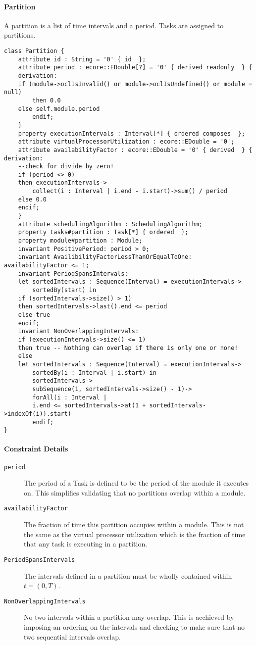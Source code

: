 \paragraph{Partition}
A partition is a list of time intervals and a period. Tasks are assigned to partitions.
\begin{lstlisting}[caption=Partition constraints]
class Partition {
    attribute id : String = '0' { id  };
    attribute period : ecore::EDouble[?] = '0' { derived readonly  } {
	derivation:
	if (module->oclIsInvalid() or module->oclIsUndefined() or module = null)
    	then 0.0
	else self.module.period
    	endif;
    }
    property executionIntervals : Interval[*] { ordered composes  };
    attribute virtualProcessorUtilization : ecore::EDouble = '0';
    attribute availabilityFactor : ecore::EDouble = '0' { derived  } { derivation:
	--check for divide by zero!
	if (period <> 0)
	then executionIntervals->
	    collect(i : Interval | i.end - i.start)->sum() / period
	else 0.0
	endif;
    }
    attribute schedulingAlgorithm : SchedulingAlgorithm;
    property tasks#partition : Task[*] { ordered  };
    property module#partition : Module;
    invariant PositivePeriod: period > 0;
    invariant AvailibilityFactorLessThanOrEqualToOne: availabilityFactor <= 1;
    invariant PeriodSpansIntervals:
	let sortedIntervals : Sequence(Interval) = executionIntervals->
	    sortedBy(start) in
	if (sortedIntervals->size() > 1)
	then sortedIntervals->last().end <= period
	else true
	endif;
    invariant NonOverlappingIntervals:
	if (executionIntervals->size() <= 1)
	then true -- Nothing can overlap if there is only one or none!
	else
	let sortedIntervals : Sequence(Interval) = executionIntervals->
	    sortedBy(i : Interval | i.start) in
	    sortedIntervals->
	    subSequence(1, sortedIntervals->size() - 1)->
	    forAll(i : Interval |
		i.end <= sortedIntervals->at(1 + sortedIntervals->indexOf(i)).start)
	    endif;
}
\end{lstlisting}
\paragraph{Constraint Details}
\begin{description}
    \item[\texttt{period}] The period of a Task is defined to be the period of the module it executes on.
    This simplifies validating that no partitions overlap within a module.
    \item[\texttt{availabilityFactor}] The fraction of time this partition occupies within a module. This
    is not the same as the virtual processor utilization which is the fraction of time that any task
    is executing in a partition.
    \item[\texttt{PeriodSpansIntervals}] The intervals defined in a partition must be wholly contained
    within $t = (0,T)$. 
    \item[\texttt{NonOverlappingIntervals}] No two intervals within a partition may overlap. This is
    acchieved by imposing an ordering on the intervals and checking to make sure that
    no two sequential intervals overlap.
\end{description}
